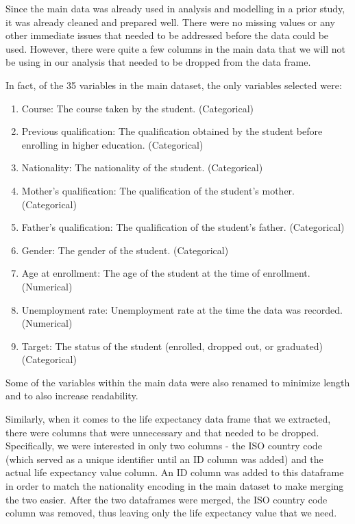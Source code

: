 \documentclass[
]{article}
\begin{document}
Since the main data was already used in analysis and modelling in a
prior study, it was already cleaned and prepared well. There were no
missing values or any other immediate issues that needed to be addressed
before the data could be used. However, there were quite a few columns
in the main data that we will not be using in our analysis that needed
to be dropped from the data frame.

In fact, of the 35 variables in the main dataset, the only variables
selected were:

\begin{enumerate}
\item Course: The course taken by the student. (Categorical)
\item Previous qualification: The qualification obtained by the student before enrolling in higher education. (Categorical)
\item Nationality: The nationality of the student. (Categorical)
\item Mother's qualification: The qualification of the student's mother. (Categorical)
\item Father's qualification: The qualification of the student's father. (Categorical)
\item Gender: The gender of the student. (Categorical)
\item Age at enrollment: The age of the student at the time of enrollment. (Numerical)
\item Unemployment rate: Unemployment rate at the time the data was recorded. (Numerical)
\item Target: The status of the student (enrolled, dropped out, or graduated) (Categorical)
\end{enumerate}

Some of the variables within the main data were also renamed to minimize
length and to also increase readability.

Similarly, when it comes to the life expectancy data frame that we
extracted, there were columns that were unnecessary and that needed to
be dropped. Specifically, we were interested in only two columns - the
ISO country code (which served as a unique identifier until an ID column
was added) and the actual life expectancy value column. An ID column was
added to this dataframe in order to match the nationality encoding in
the main dataset to make merging the two easier. After the two
dataframes were merged, the ISO country code column was removed, thus
leaving only the life expectancy value that we need.
\end{document}
